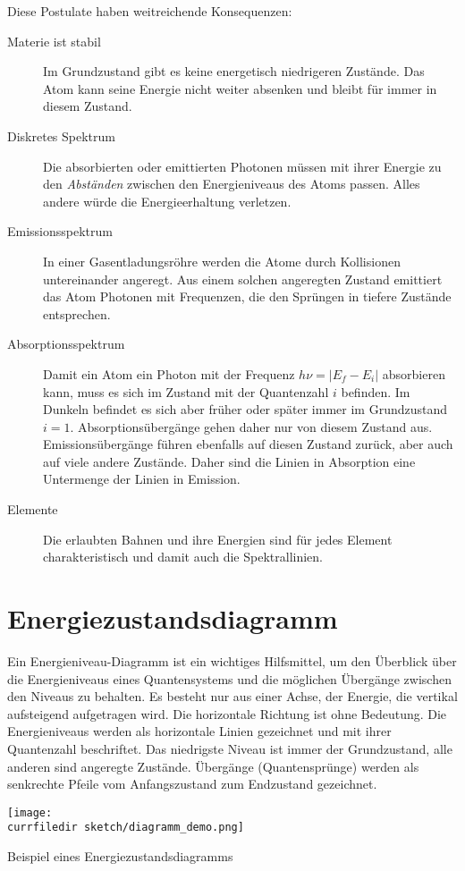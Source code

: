 Diese Postulate haben weitreichende Konsequenzen:
\begin{description}
    \item[Materie ist stabil] Im Grundzustand gibt es keine energetisch niedrigeren Zustände. Das Atom kann seine Energie nicht weiter absenken und bleibt für immer in diesem Zustand.
    \item[Diskretes Spektrum] Die absorbierten oder emittierten Photonen müssen mit ihrer Energie zu den \emph{Abständen} zwischen den Energieniveaus des Atoms passen. Alles andere würde die Energieerhaltung verletzen.
    \item[Emissionsspektrum] In einer Gasentladungsröhre werden die Atome durch Kollisionen untereinander angeregt. Aus einem solchen  angeregten Zustand emittiert das Atom Photonen mit Frequenzen, die den Sprüngen in tiefere Zustände entsprechen.
    \item[Absorptionsspektrum] Damit ein Atom ein Photon mit der Frequenz $ h \nu = | E_f - E_i |$ absorbieren kann, muss es sich im Zustand mit der Quantenzahl $i$ befinden. Im Dunkeln befindet es sich aber früher oder später immer im Grundzustand $i=1$. Absorptionsübergänge gehen daher nur von diesem Zustand aus. Emissionsübergänge führen ebenfalls auf diesen Zustand zurück, aber auch auf viele andere Zustände. Daher sind die Linien in Absorption eine Untermenge der Linien in Emission.
    \item[Elemente] Die erlaubten Bahnen und ihre Energien sind für jedes Element charakteristisch und damit auch die Spektrallinien. 
\end{description}


\section{Energiezustandsdiagramm}

Ein Energieniveau-Diagramm ist ein wichtiges Hilfsmittel, um den Überblick über die Energieniveaus eines Quantensystems und die möglichen Übergänge zwischen den Niveaus zu behalten. Es besteht nur aus einer Achse, der Energie, die vertikal aufsteigend aufgetragen wird. Die horizontale Richtung ist ohne Bedeutung. Die Energieniveaus werden als horizontale Linien gezeichnet und mit ihrer Quantenzahl beschriftet. Das niedrigste Niveau ist immer der Grundzustand, alle anderen sind angeregte Zustände. Übergänge (Quantensprünge) werden als senkrechte Pfeile vom Anfangszustand zum Endzustand gezeichnet.


\begin{marginfigure}
    \texttt{[image: \\currfiledir sketch/diagramm\_demo.png]}
    \caption{Beispiel eines Energiezustandsdiagramms}
 \end{marginfigure}


